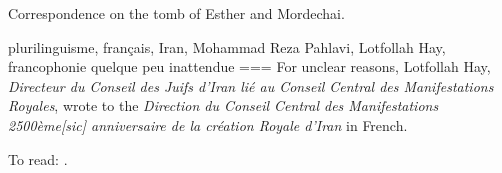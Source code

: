 Correspondence on the tomb of Esther and Mordechai.

plurilinguisme, français, Iran, Mohammad Reza Pahlavi, Lotfollah Hay, francophonie quelque peu inattendue
===
For unclear reasons, Lotfollah Hay, \emph{Directeur du Conseil des Juifs d’Iran lié au Conseil Central des Manifestations Royales}, wrote to the \emph{Direction du Conseil Central des Manifestations 2500ème[sic] anniversaire de la création Royale d’Iran} in French. 

To read: \textcite{sharif2015}.

\nocite{malul2020}
